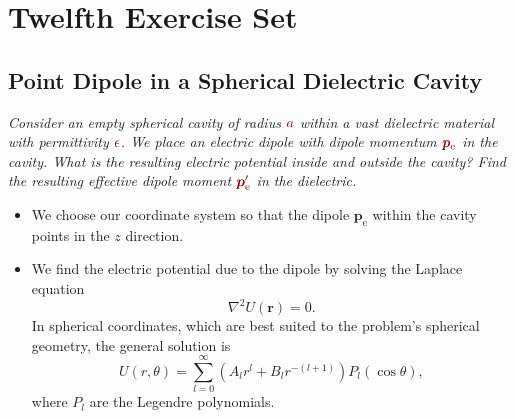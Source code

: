 \documentclass[11pt, a4paper]{article}
\newcommand{\dmath}[1]{\textcolor{Maroon}{#1}}  %
\renewcommand{\vec}[1]{\bm{#1}} %
\renewcommand{\r}{\vec{r}}
\newcommand{\e}{\epsilon}
\newcommand{\pe}{\vec{p}_{\text{e}}}  %
\renewcommand{\laplacian}{\nabla^{2}}
\begin{document}
\newpage
\section{Twelfth Exercise Set}
\subsection{Point Dipole in a Spherical Dielectric Cavity}
\textit{Consider an empty spherical cavity of radius $ \dmath{a} $ within a vast dielectric material with permittivity $ \dmath{\e} $. We place an electric dipole with dipole momentum $ \dmath{\pe} $ in the cavity. What is the resulting electric potential inside and outside the cavity? Find the resulting effective dipole moment $ \dmath{\pe'} $ in the dielectric.}
\begin{itemize}
	\item  We choose our coordinate system so that the dipole $ \pe $ within the cavity points in the $ z $ direction.
	
	
	\item We find the electric potential due to the dipole by solving the Laplace equation 
	\begin{equation*}
		\laplacian U(\r) = 0.
	\end{equation*}
	In spherical coordinates, which are best suited to the problem's spherical geometry, the general solution is
	\begin{equation*}
		U(r, \theta) = \sum_{l = 0}^{\infty}(A_{l}r^{l} + B_{l}r^{-(l+1)})P_{l}(\cos \theta),
	\end{equation*}
	where $ P_{l} $ are the Legendre polynomials.
	

\end{itemize}
\end{document}
